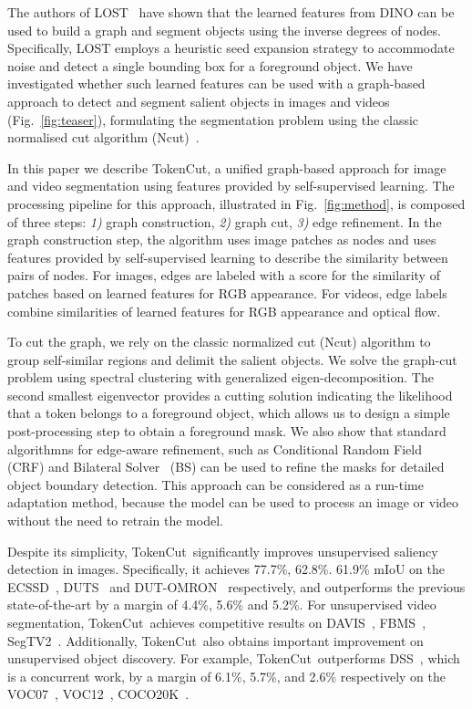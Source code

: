 \documentclass[twocolumn]{article}
\newcommand{\name} {TokenCut}
\begin{document}
The authors of LOST~\cite{simeoni2021localizing} have shown that the learned features from DINO can be used to build a graph and segment objects using the inverse degrees of nodes. Specifically, LOST employs a heuristic seed expansion strategy to accommodate noise and detect a single bounding box for a foreground object. We have investigated whether such learned features can be used with a graph-based approach to detect and segment salient objects in images and videos (Fig.~\ref{fig:teaser}), formulating the segmentation problem using the classic normalised cut algorithm (Ncut)~\cite{shi2000normalized}. 

In this paper we describe \name, a unified graph-based approach for image and video segmentation using features provided by self-supervised learning. The processing pipeline for this approach, illustrated in Fig.~\ref{fig:method}, is composed of three steps: \textit{1)} graph construction, \textit{2)} graph cut, \textit{3)} edge refinement. In the graph construction step, the algorithm uses image patches as nodes and uses features provided by self-supervised learning to describe the similarity between pairs of nodes.  For images, edges are labeled with a score for the similarity of patches based on learned features for RGB appearance.
For videos, edge labels combine similarities of learned features for RGB appearance and optical flow.

To cut the graph, we rely on the classic normalized cut (Ncut) algorithm
to group self-similar regions and delimit the salient objects. 
We solve the graph-cut problem using spectral clustering with generalized eigen-decomposition. The second smallest eigenvector provides a cutting solution indicating the likelihood that a token belongs to a foreground object, which allows us to design a simple post-processing step to obtain a foreground mask. We also show that standard algorithmns for edge-aware refinement, such as Conditional Random Field~\cite{krahenbuhl2011efficient} (CRF) and Bilateral Solver~\cite{barron2016fast} (BS) can be used to refine the masks for detailed object boundary detection. This approach can be considered as a run-time adaptation method, because the model can be used to process an image or video without the need to retrain the model.

Despite its simplicity, \name~significantly improves unsupervised saliency detection in images. Specifically, it achieves 77.7\%, 62.8\%. 61.9\% mIoU on the ECSSD~\cite{shi2015hierarchical}, DUTS~\cite{wang2017learning} and DUT-OMRON~\cite{yang2013saliency} respectively, and outperforms the previous state-of-the-art by a margin of 4.4\%, 5.6\% and 5.2\%. For unsupervised video segmentation, \name~achieves competitive results on DAVIS~\cite{perazzi2016benchmark}, FBMS~\cite{ochs2013segmentation}, SegTV2~\cite{li2013video}. Additionally, \name~also obtains important improvement on unsupervised object discovery. For example, \name~outperforms DSS~\cite{melaskyriazi2022deep}, which is a concurrent work, by a margin of 6.1\%, 5.7\%,
and 2.6\% respectively on the VOC07~\cite{pascal-voc-2007}, VOC12~\cite{pascal-voc-2012}, COCO20K~\cite{lin2014microsoft}.
\end{document}
